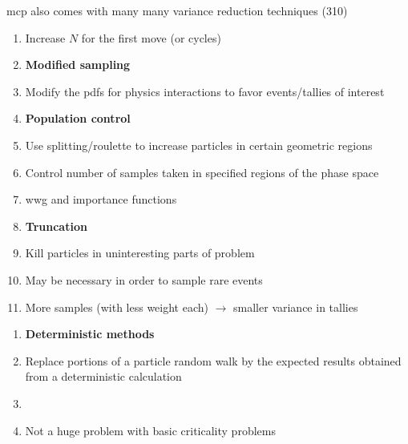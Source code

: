 \documentclass[aspectratio=1610,pdftex,dvipsnames,compress,xcolor={dvipsnames}]{beamer}
\newcommand{\acf}{\acrfull} %
\newcommand{\acs}{\acrshort} %
\begin{document}
\addtocounter{framenumber}{-1} 
\begin{frame}{\acs{mcp} also comes with many many variance reduction techniques (310)}
    \begin{enumerate}[series=checks,topsep=0pt,itemsep=5pt,leftmargin=*,label=(\arabic*)]
        \item[]Increase $N$ for the first move (or cycles)
            \vspace{0.10in}
        \item[]\textbf{Modified sampling}
        \item[]Modify the pdfs for physics interactions to favor events/tallies of interest
            \vspace{0.10in}
        \item[]\textbf{Population control}
        \item[]Use splitting/roulette to increase particles in certain geometric regions
        \item[]Control number of samples taken in specified regions of the phase space
        \item[]\acf{wwg} and importance functions
            \vspace{0.10in}
        \item[]\textbf{Truncation}
        \item[]Kill particles in uninteresting parts of problem
        \item[]May be necessary in order to sample rare events
        \item[]More samples (with less weight each) $\rightarrow$ smaller variance in tallies
    \end{enumerate}
\end{frame}


\begin{frame}[t]{}
    \begin{enumerate}[series=checks,topsep=0pt,itemsep=5pt,leftmargin=*,label=(\arabic*)]
        \item[]\textbf{Deterministic methods}
        \item[]Replace portions of a particle random walk by the expected results obtained from a deterministic calculation
        \item[]
            \vspace{0.20in}
        \item[]Not a huge problem with basic criticality problems
    \end{enumerate}
\end{frame}
\end{document}

